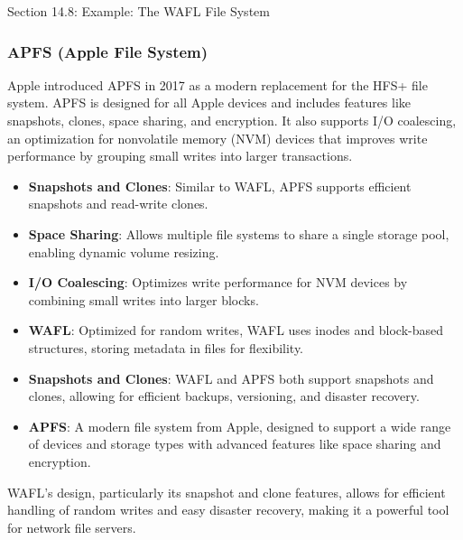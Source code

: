 \begin{notes}{Section 14.8: Example: The WAFL File System}
\begin{highlight}
    \end{highlight}
    
    \subsubsection*{APFS (Apple File System)}
    
    Apple introduced APFS in 2017 as a modern replacement for the HFS+ file system. APFS is designed for all Apple devices and includes features like snapshots, clones, space sharing, and encryption. 
    It also supports I/O coalescing, an optimization for nonvolatile memory (NVM) devices that improves write performance by grouping small writes into larger transactions.
    
    \begin{highlight}
    
        \begin{itemize}
            \item \textbf{Snapshots and Clones}: Similar to WAFL, APFS supports efficient snapshots and read-write clones.
            \item \textbf{Space Sharing}: Allows multiple file systems to share a single storage pool, enabling dynamic volume resizing.
            \item \textbf{I/O Coalescing}: Optimizes write performance for NVM devices by combining small writes into larger blocks.
        \end{itemize}
    
    \end{highlight}
    
    \begin{highlight}
    
        \begin{itemize}
            \item \textbf{WAFL}: Optimized for random writes, WAFL uses inodes and block-based structures, storing metadata in files for flexibility.
            \item \textbf{Snapshots and Clones}: WAFL and APFS both support snapshots and clones, allowing for efficient backups, versioning, and disaster recovery.
            \item \textbf{APFS}: A modern file system from Apple, designed to support a wide range of devices and storage types with advanced features like space sharing and encryption.
        \end{itemize}
    
    WAFL's design, particularly its snapshot and clone features, allows for efficient handling of random writes and easy disaster recovery, making it a powerful tool for network file servers.
    
    \end{highlight}
\end{notes}

